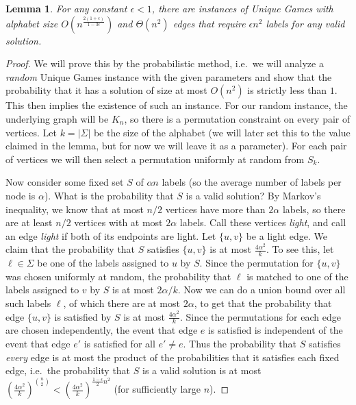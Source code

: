 \documentclass[11pt,letterpaper]{article}
\newtheorem{lemma}[theorem]{Lemma}
\theoremstyle{definition}
\begin{document}
\begin{lemma} \label{lem:Unique} For any constant $\epsilon < 1$,
  there are instances of Unique Games with alphabet size
  $O\left(n^{\frac{2(1+\epsilon)}{1-3\epsilon}}\right)$ and $\Theta(n^2)$ edges that
  require $\epsilon n^2$ labels for any valid solution.
\end{lemma}
\begin{proof}
  We will prove this by the probabilistic method, i.e.\ we will
  analyze a \emph{random} Unique Games instance with the given
  parameters and show that the probability that it has a solution of
  size at most $O(n^2)$ is strictly less than $1$.  This then implies
  the existence of such an instance.  For our random instance, the
  underlying graph will be $K_n$, so there is a permutation constraint
  on every pair of vertices.  Let $k = |\Sigma|$ be the size of the
  alphabet (we will later set this to the value claimed in the lemma, but for now we will leave it
  as a parameter).  For each pair of vertices we will then select a
  permutation uniformly at random from $S_k$.

  Now consider some fixed set $S$ of $\alpha n$ labels (so the average
  number of labels per node is $\alpha$).  What is the probability
  that $S$ is a valid solution?  By Markov's inequality, we know that
  at most $n/2$ vertices have more than $2\alpha$ labels, so there are
  at least $n/2$ vertices with at most $2\alpha$ labels.  Call these
  vertices \emph{light}, and call an edge \emph{light} if both of its
  endpoints are light.  Let $\{u,v\}$ be a light edge.  We claim that
  the probability that $S$ satisfies $\{u,v\}$ is at most
  $\frac{4\alpha^2}{k}$.  To see this, let $\ell \in \Sigma$ be one of
  the labels assigned to $u$ by $S$.  Since the permutation for
  $\{u,v\}$ was chosen uniformly at random, the probability that
  $\ell$ is matched to one of the labels assigned to $v$ by $S$ is at
  most $2\alpha / k$.  Now we can do a union bound over all such
  labels $\ell$, of which there are at most $2\alpha$, to get that the
  probability that edge $\{u,v\}$ is satisfied by $S$ is at most
  $\frac{4\alpha^2}{k}$.  Since the permutations for each edge are
  chosen independently, the event that edge $e$ is satisfied is
  independent of the event that edge $e'$ is satisfied for all $e'
  \neq e$.  Thus the probability that $S$ satisfies \emph{every} edge
  is at most the product of the probabilities that it satisfies each
  fixed edge, i.e.\ the probability that $S$ is a valid solution is at
  most $\left(\frac{4\alpha^2}{k}\right)^{{n \choose 2}} <
  \left(\frac{4\alpha^2}{k}\right)^{\frac{1-\epsilon}{2}n^2}$ (for sufficiently large $n$).


\end{proof}
\end{document}
